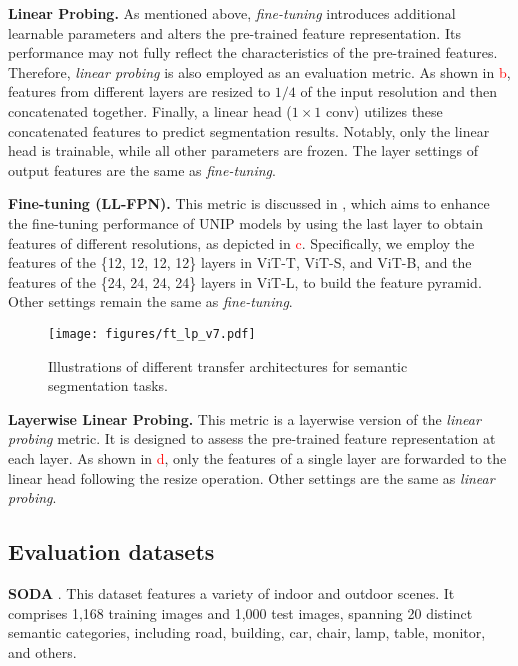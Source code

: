\textbf{Linear Probing.} As mentioned above, \textit{fine-tuning} introduces additional learnable parameters and alters the pre-trained feature representation. Its performance may not fully reflect the characteristics of the pre-trained features. Therefore, \textit{linear probing} is also employed as an evaluation metric. As shown in \textcolor{red}{b}, features from different layers are resized to $1/4$ of the input resolution and then concatenated together. Finally, a linear head ($1\times1$ conv) utilizes these concatenated features to predict segmentation results. Notably, only the linear head is trainable, while all other parameters are frozen. The layer settings of output features are the same as \textit{fine-tuning}.

\textbf{Fine-tuning (LL-FPN).} This metric is discussed in , which aims to enhance the fine-tuning performance of UNIP models by using the last layer to obtain features of different resolutions, as depicted in \textcolor{red}{c}. Specifically, we employ the features of the \{12, 12, 12, 12\} layers in ViT-T, ViT-S, and ViT-B, and the features of the \{24, 24, 24, 24\} layers in ViT-L, to build the feature pyramid. Other settings remain the same as \textit{fine-tuning}.

\begin{figure}[t]
\centering
\texttt{[image: figures/ft\_lp\_v7.pdf]}
\vspace{-20pt}
\caption{Illustrations of different transfer architectures for semantic segmentation tasks.}
\label{fig:ft_lp}
\vspace{-8pt}
\end{figure}

\textbf{Layerwise Linear Probing.} This metric is a layerwise version of the \textit{linear probing} metric. It is designed to assess the pre-trained feature representation at each layer. As shown in \textcolor{red}{d}, only the features of a single layer are forwarded to the linear head following the resize operation. Other settings are the same as \textit{linear probing}.




\subsection{Evaluation datasets}
\label{app:evaluation_datasets}

\textbf{SODA} \citep{soda}. This dataset features a variety of indoor and outdoor scenes. It comprises 1,168 training images and 1,000 test images, spanning 20 distinct semantic categories, including road, building, car, chair, lamp, table, monitor, and others.

